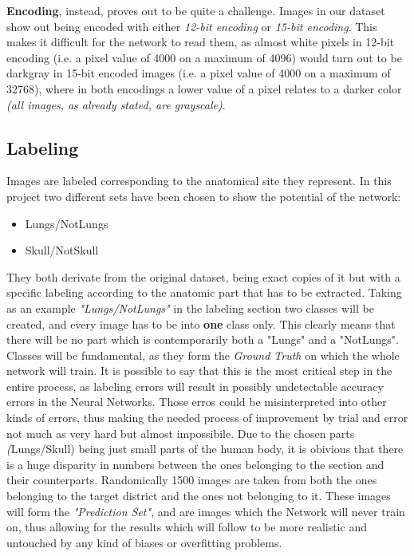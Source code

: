 \documentclass[../main.tex]{subfiles}
\begin{document}
\textbf{Encoding}, instead, proves out to be quite a challenge. Images in our dataset show out being encoded with either \textit{12-bit encoding} or \textit{15-bit encoding}. This makes it difficult for the network to read them, as almost white pixels in 12-bit encoding (i.e. a pixel value of 4000 on a maximum of 4096) would turn out to be darkgray in 15-bit encoded images (i.e. a pixel value of 4000 on a maximum of 32768), where in both encodings a lower value of a pixel relates to a darker color \textit{(all images, as already stated, are grayscale)}.

\subsection{Labeling}
Images are labeled corresponding to the anatomical site they represent. In this project two different sets have been chosen to show the potential of the network:
\begin{itemize}
	\item Lungs/NotLungs
	\item Skull/NotSkull
\end{itemize}
They both derivate from the original dataset, being exact copies of it but with a specific labeling according to the anatomic part that has to be extracted. Taking as an example \textit{"Lungs/NotLungs"} in the labeling section two classes will be created, and every image has to be into \textbf{one} class only. This clearly means that there will be no part which is contemporarily both a "Lungs" and a "NotLungs". Classes will be fundamental, as they form the \textit{Ground Truth} on which the whole network will train. It is possible to say that this is the most critical step in the entire process, as labeling errors will result in possibly undetectable accuracy errors in the Neural Networks. Those erros could be misinterpreted into other kinds of errors, thus making the needed process of improvement by trial and error not much as very hard but almost impossibile.
Due to the chosen parts \textit(Lungs/Skull) being just small parts of the human body, it is obivious that there is a huge disparity in numbers between the ones belonging to the section and their counterparts. Randomically 1500 images are taken from both the ones belonging to the target district and the ones not belonging to it. These images will form the \textit{"Prediction Set"}, and are images which the Network will never train on, thus allowing for the results which will follow to be more realistic and untouched by any kind of biases or overfitting problems. 
\end{document}
